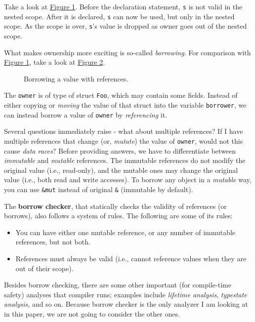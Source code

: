 Take a look at \hyperref[rustex1]{Figure 1}. Before the declaration statement,
\texttt{s} is not valid in the nested scope. After it is declared, 
\texttt{s} can now be used, but only in the nested scope. As the scope
is over, \texttt{s}'s value is dropped as owner goes out of the nested scope.

What makes ownership more exciting is so-called \textit{borrowing}. For comparison
with \hyperref[rustex1]{Figure 1}, take a look at \hyperref[rustex2]{Figure 2}.

\begin{figure*}[ht]
    \begin{center}
    
    \end{center}
    \caption{Borrowing a value with references.}
    \label{rustex2}
\end{figure*}

The \texttt{owner} is of type of struct \texttt{Foo}, which may contain some fields.
Instead of either copying or \textit{moving} the value of that struct into the variable
\texttt{borrower}, we can instead borrow a value of \texttt{owner} by \textit{referencing}
it.

Several questions immediately raise - what about multiple references? If I have 
multiple references that change (or, \textit{mutate}) the value of \texttt{owner},
would not this cause \textit{data races}? Before providing answers, we have to differentiate
between \textit{immutable} and \textit{mutable} references. The immutable references do not
modify the original value (i.e., read-only), and the mutable ones may
change the original value (i.e., both read and write accesses). To borrow
any object in a \textit{mutable} way, you can use \texttt{\&mut} instead of
original \texttt{\&} (immutable by default).

The \textbf{borrow checker}, that statically checks the validity of references (or borrows),
also follows a system of rules. The following are some of its rules:

\begin{itemize}
    \item You can have either one mutable reference, or any number of immutable references,
          but not both.
    \item References must always be valid (i.e., cannot reference values when they are out
         of their scope).
\end{itemize}

Besides borrow checking, there are some other important (for compile-time safety)
analyses that compiler runs; examples include \textit{lifetime analysis}, \textit{typestate
analysis}, and so on. Because borrow checker is the only analyzer I am looking at
in this paper, we are not going to consider the other ones.
